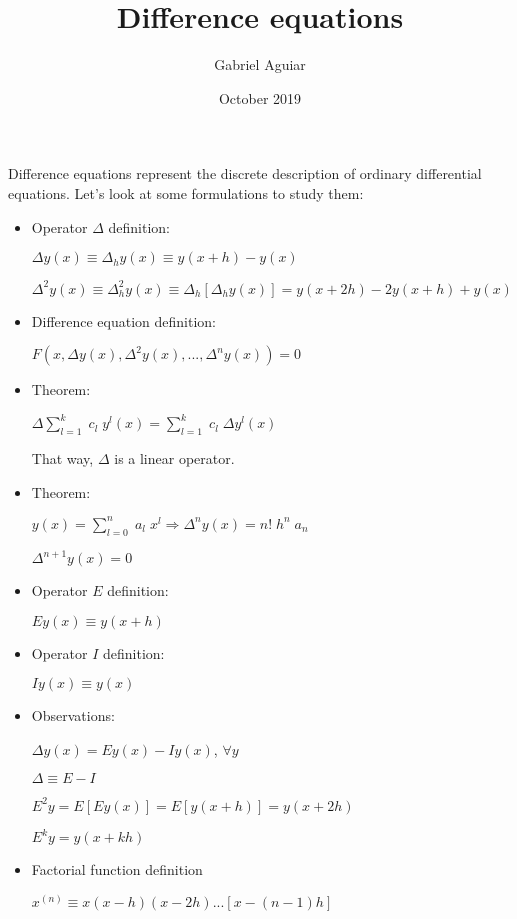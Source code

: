 \documentclass{article}
\title{Difference equations}
\author{Gabriel Aguiar}
\date{October 2019}
\begin{document}
\maketitle

Difference equations represent the discrete description of ordinary differential equations. Let's look at some formulations to study them:

\begin{itemize}

\item Operator $\Delta$ definition:

$\Delta y(x) \equiv \Delta_{h} y(x) \equiv y(x + h) - y(x)$

$\Delta^{2} y(x) \equiv \Delta_{h}^{2} y(x) \equiv \Delta_{h} [\Delta_{h} y(x)] = y(x + 2h) - 2y(x + h) + y(x)$

\item Difference equation definition:

$F(x,\Delta y(x),\Delta^{2} y(x),...,\Delta^{n}y(x)) = 0$

\item Theorem:

$\Delta \sum\limits_{l = 1}^{k} \; c_{l} \; y^{l} (x) = \sum\limits_{l = 1}^{k} \; c_{l} \; \Delta y^{l} (x)$

That way, $\Delta$ is a linear operator.

\item Theorem:

$y(x) = \sum\limits_{l = 0}^{n} \; a_{l} \; x^{l} \Rightarrow \Delta^{n} y(x) = n! \; h^{n} \; a_{n}$

$\Delta^{n + 1} y(x) = 0$

\item Operator $E$ definition:

$Ey(x) \equiv y(x + h)$

\item Operator $I$ definition:

$Iy(x) \equiv y(x)$

\item Observations:

$\Delta y(x) = Ey(x) - Iy(x)$, $\forall y$

$\Delta \equiv E - I$

$E^{2} y = E[Ey(x)] = E[y(x + h)] = y(x + 2h)$

$E^{k} y = y(x + kh)$

\item Factorial function definition

$x^{(n)} \equiv x(x - h)(x - 2h) ... [x - (n - 1)h]$


\end{itemize}
\end{document}
